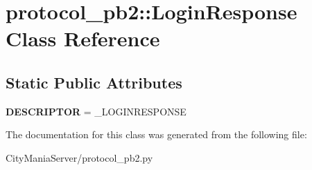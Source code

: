 \hypertarget{classprotocol__pb2_1_1LoginResponse}{
\section{protocol\_\-pb2::LoginResponse Class Reference}
\label{classprotocol__pb2_1_1LoginResponse}
}
\subsection*{Static Public Attributes}
\begin{DoxyCompactItemize}
\item 
\hypertarget{classprotocol__pb2_1_1LoginResponse_af7d57e7d6c0c22937f0a42d880743262}{
{\bfseries DESCRIPTOR} = \_\-LOGINRESPONSE}
\label{classprotocol__pb2_1_1LoginResponse_af7d57e7d6c0c22937f0a42d880743262}

\end{DoxyCompactItemize}


The documentation for this class was generated from the following file:\begin{DoxyCompactItemize}
\item 
CityManiaServer/protocol\_\-pb2.py\end{DoxyCompactItemize}

